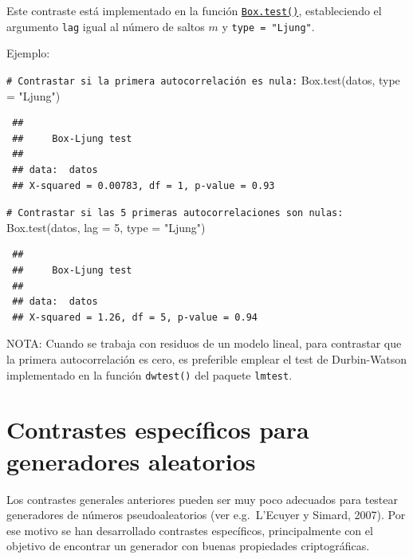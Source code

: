 \documentclass[
  10pt,
]{book}
\newenvironment{Shaded}{\begin{snugshade}}{\end{snugshade}}
\newcommand{\AttributeTok}[1]{\textcolor[rgb]{0.77,0.63,0.00}{#1}}
\newcommand{\CommentTok}[1]{\textcolor[rgb]{0.56,0.35,0.01}{\textit{#1}}}
\newcommand{\DecValTok}[1]{\textcolor[rgb]{0.00,0.00,0.81}{#1}}
\newcommand{\FunctionTok}[1]{\textcolor[rgb]{0.00,0.00,0.00}{#1}}
\newcommand{\NormalTok}[1]{#1}
\newcommand{\StringTok}[1]{\textcolor[rgb]{0.31,0.60,0.02}{#1}}
\theoremstyle{break}
\theoremstyle{nonumberplain}
\renewcommand{\CommentTok}[1]{\textcolor[rgb]{0.41,0.41,0.41}{\texttt{#1}}}
\begin{document}
Este contraste está implementado en la función \href{https://rdrr.io/r/stats/box.test.html}{\texttt{Box.test()}}, estableciendo el argumento \texttt{lag} igual al número de saltos \(m\) y \texttt{type\ =\ "Ljung"}.

Ejemplo:

\begin{Shaded}
\begin{Highlighting}[]
\CommentTok{\# Contrastar si la primera autocorrelación es nula:}
\FunctionTok{Box.test}\NormalTok{(datos, }\AttributeTok{type =} \StringTok{"Ljung"}\NormalTok{) }
\end{Highlighting}
\end{Shaded}

\begin{verbatim}
 ## 
 ##     Box-Ljung test
 ## 
 ## data:  datos
 ## X-squared = 0.00783, df = 1, p-value = 0.93
\end{verbatim}

\begin{Shaded}
\begin{Highlighting}[]
\CommentTok{\# Contrastar si las 5 primeras autocorrelaciones son nulas:}
\FunctionTok{Box.test}\NormalTok{(datos, }\AttributeTok{lag =} \DecValTok{5}\NormalTok{, }\AttributeTok{type =} \StringTok{"Ljung"}\NormalTok{) }
\end{Highlighting}
\end{Shaded}

\begin{verbatim}
 ## 
 ##     Box-Ljung test
 ## 
 ## data:  datos
 ## X-squared = 1.26, df = 5, p-value = 0.94
\end{verbatim}

NOTA: Cuando se trabaja con residuos de un modelo lineal, para contrastar que la primera autocorrelación es cero, es preferible emplear el test de
Durbin-Watson implementado en la función \texttt{dwtest()} del paquete \texttt{lmtest}.

\hypertarget{contrastes-especuxedficos-para-generadores-aleatorios}{%
\section{Contrastes específicos para generadores aleatorios}\label{contrastes-especuxedficos-para-generadores-aleatorios}}

Los contrastes generales anteriores pueden ser muy poco adecuados para testear generadores de números pseudoaleatorios (ver e.g.~L'Ecuyer y Simard, 2007). Por ese motivo se han desarrollado contrastes específicos, principalmente con el objetivo de encontrar un generador con buenas propiedades criptográficas.
\end{document}

